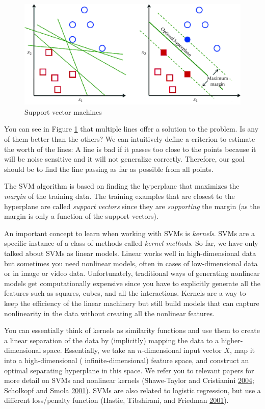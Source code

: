 \documentclass[]{krantz}
\begin{document}
\begin{figure}

{\centering \includegraphics[width=1\linewidth]{ChapterML/figures/svm} 

}

\caption{Support vector machines}\label{fig:svm}
\end{figure}

You can see in Figure \ref{fig:svm} that multiple lines offer a solution
to the problem. Is any of them better than the others? We can
intuitively define a criterion to estimate the worth of the lines: A
line is bad if it passes too close to the points because it will be
noise sensitive and it will not generalize correctly. Therefore, our
goal should be to find the line passing as far as possible from all
points.

The SVM algorithm is based on finding the hyperplane that maximizes the
\emph{margin} of the training data. The training examples that are
closest to the hyperplane are called \emph{support vectors} since they
are \emph{supporting} the margin (as the margin is only a function of
the support vectors).

An important concept to learn when working with SVMs is \emph{kernels}.
SVMs are a specific instance of a class of methods called \emph{kernel
methods}. So far, we have only talked about SVMs as linear models.
Linear works well in high-dimensional data but sometimes you need
nonlinear models, often in cases of low-dimensional data or in image or
video data. Unfortunately, traditional ways of generating nonlinear
models get computationally expensive since you have to explicitly
generate all the features such as squares, cubes, and all the
interactions. Kernels are a way to keep the efficiency of the linear
machinery but still build models that can capture nonlinearity in the
data without creating all the nonlinear features.

You can essentially think of kernels as similarity functions and use
them to create a linear separation of the data by (implicitly) mapping
the data to a higher-dimensional space. Essentially, we take an
\(n\)-dimensional input vector \(X\), map it into a high-dimensional (
infinite-dimensional) feature space, and construct an optimal separating
hyperplane in this space. We refer you to relevant papers for more
detail on SVMs and nonlinear kernels (Shawe-Taylor and Cristianini
\protect\hyperlink{ref-ShaweTaylor2004}{2004}; Scholkopf and Smola
\protect\hyperlink{ref-Scholkopf2001}{2001}). SVMs are also related to
logistic regression, but use a different loss/penalty function (Hastie,
Tibshirani, and Friedman
\protect\hyperlink{ref-HastieTibshirani}{2001}).
\end{document}
